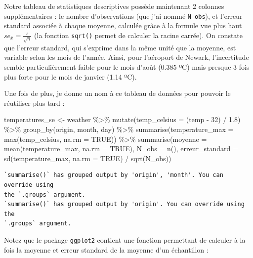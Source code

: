 \documentclass[
  a4paper,
  DIV=11,
  numbers=noendperiod,
  oneside]{scrreprt}
\newenvironment{Shaded}{}{}
\newcommand{\AttributeTok}[1]{\textcolor[rgb]{0.84,0.23,0.29}{#1}}
\newcommand{\ConstantTok}[1]{\textcolor[rgb]{0.00,0.36,0.77}{#1}}
\newcommand{\DecValTok}[1]{\textcolor[rgb]{0.00,0.36,0.77}{#1}}
\newcommand{\FloatTok}[1]{\textcolor[rgb]{0.00,0.36,0.77}{#1}}
\newcommand{\FunctionTok}[1]{\textcolor[rgb]{0.44,0.26,0.76}{#1}}
\newcommand{\NormalTok}[1]{\textcolor[rgb]{0.14,0.16,0.18}{#1}}
\newcommand{\OtherTok}[1]{\textcolor[rgb]{0.44,0.26,0.76}{#1}}
\newcommand{\SpecialCharTok}[1]{\textcolor[rgb]{0.00,0.36,0.77}{#1}}
\begin{document}
Notre tableau de statistiques descriptives possède maintenant 2 colonnes
supplémentaires : le nombre d'observations (que j'ai nommé
\texttt{N\_obs}), et l'erreur standard associée à chaque moyenne,
calculée grâce à la formule vue plus haut
\(se_{\bar{x}} = \frac{s}{\sqrt{n}}\) (la fonction \texttt{sqrt()}
permet de calculer la racine carrée). On constate que l'erreur standard,
qui s'exprime dans la même unité que la moyenne, est variable selon les
mois de l'année. Ainsi, pour l'aéroport de Newark, l'incertitude semble
particulièrement faible pour le mois d'août (0.385 ºC) mais presque 3
fois plus forte pour le mois de janvier (1.14 ºC).

Une fois de plus, je donne un nom à ce tableau de données pour pouvoir
le réutiliser plus tard :

\begin{Shaded}
\begin{Highlighting}[]
\NormalTok{temperatures\_se }\OtherTok{\textless{}{-}}\NormalTok{ weather }\SpecialCharTok{\%\textgreater{}\%} 
  \FunctionTok{mutate}\NormalTok{(}\AttributeTok{temp\_celsius =}\NormalTok{ (temp }\SpecialCharTok{{-}} \DecValTok{32}\NormalTok{) }\SpecialCharTok{/} \FloatTok{1.8}\NormalTok{) }\SpecialCharTok{\%\textgreater{}\%} 
  \FunctionTok{group\_by}\NormalTok{(origin, month, day) }\SpecialCharTok{\%\textgreater{}\%} 
  \FunctionTok{summarise}\NormalTok{(}\AttributeTok{temperature\_max =} \FunctionTok{max}\NormalTok{(temp\_celsius, }\AttributeTok{na.rm =} \ConstantTok{TRUE}\NormalTok{)) }\SpecialCharTok{\%\textgreater{}\%} 
  \FunctionTok{summarise}\NormalTok{(}\AttributeTok{moyenne =} \FunctionTok{mean}\NormalTok{(temperature\_max, }\AttributeTok{na.rm =} \ConstantTok{TRUE}\NormalTok{),}
            \AttributeTok{N\_obs =} \FunctionTok{n}\NormalTok{(),}
            \AttributeTok{erreur\_standard =} \FunctionTok{sd}\NormalTok{(temperature\_max, }\AttributeTok{na.rm =} \ConstantTok{TRUE}\NormalTok{) }\SpecialCharTok{/} \FunctionTok{sqrt}\NormalTok{(N\_obs))}
\end{Highlighting}
\end{Shaded}

\begin{verbatim}
`summarise()` has grouped output by 'origin', 'month'. You can override using
the `.groups` argument.
`summarise()` has grouped output by 'origin'. You can override using the
`.groups` argument.
\end{verbatim}

Notez que le package \texttt{ggplot2} contient une fonction permettant
de calculer à la fois la moyenne et erreur standard de la moyenne d'un
échantillon :
\end{document}
